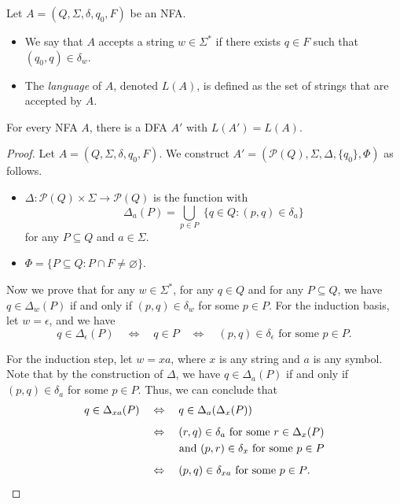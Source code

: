 \begin{definition}
  Let $A = (Q, \Sigma, \delta, q_0, F)$ be an NFA.
  \begin{itemize}
    \item We say that $A$ accepts a string $w \in \Sigma^*$ if there exists
    $q \in F$ such that $(q_0, q) \in \delta_w$.
    \item The \emph{language} of $A$, denoted $L(A)$, is defined as the set of
    strings that are accepted by $A$.
  \end{itemize}
\end{definition}

\begin{theorem}
  For every NFA $A$, there is a DFA $A'$ with $L(A') = L(A)$.
\end{theorem}
\begin{proof}
  Let $A = (Q, \Sigma, \delta, q_0, F)$.
  We construct $A' = (\mathcal{P}(Q), \Sigma, \Delta, \{q_0\}, \Phi)$
  as follows.
  \begin{itemize}
    \item $\Delta: \mathcal{P}(Q) \times \Sigma \to \mathcal{P}(Q)$ is the
    function with
    \begin{equation*}
      \Delta_a(P) = \bigcup_{p \in P} \; \{q \in Q: (p, q) \in \delta_a\}
    \end{equation*}
    for any $P \subseteq Q$ and $a \in \Sigma$.
    \item $\Phi = \{P \subseteq Q: P \cap F \neq \varnothing\}$.
  \end{itemize}
  Now we prove that for any $w \in \Sigma^*$, for any $q \in Q$ and for any
  $P \subseteq Q$, we have $q \in \Delta_w(P)$ if and only if
  $(p, q) \in \delta_w$ for some $p \in P$.
  For the induction basis, let $w = \epsilon$, and we have
  \begin{equation*}
    q \in \Delta_\epsilon(P)
    \quad \Leftrightarrow \quad
    q \in P
    \quad \Leftrightarrow \quad
    \text{$(p, q) \in \delta_\epsilon$ for some $p \in P$}.
  \end{equation*}

  For the induction step, let $w = xa$, where $x$ is any string and $a$ is any
  symbol.
  Note that by the construction of $\Delta$, we have $q \in \Delta_a(P)$ if and
  only if $(p, q) \in \delta_a$ for some $p \in P$.
  Thus, we can conclude that
  \begin{align*}
    q \in \Delta_{xa}(P)
    \quad &\Leftrightarrow \quad
    q \in \Delta_a(\Delta_x(P)) \\[.5em]
    \quad &\Leftrightarrow \quad
    \text{$(r, q) \in \delta_a$ for some $r \in \Delta_x(P)$} \\
    &\hspace*{2.6em} \text{and $(p, r) \in \delta_x$ for some $p \in P$}
    \\[.5em]
    \quad &\Leftrightarrow \quad
    \text{$(p, q) \in \delta_{xa}$ for some $p \in P$}.
  \end{align*}


\end{proof}
